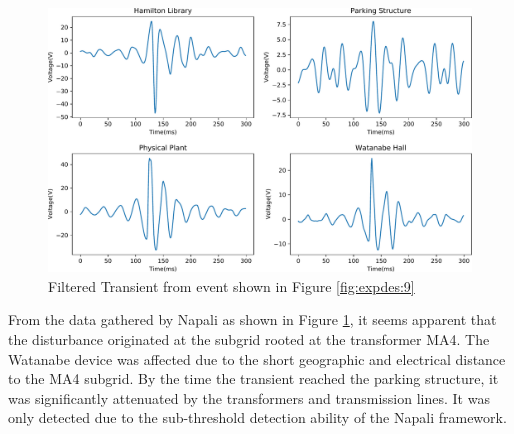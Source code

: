 \begin{figure}[ht!]
    \centering
    \includegraphics[width=1\linewidth]{img/deployment/gridwide_locality.pdf}
    \caption{Filtered Transient from event shown in Figure \ref{fig:expdes:9}}
    \label{expdes:fig:grid_wide_filtered}
\end{figure}

From the data gathered by Napali as shown in Figure \ref{expdes:fig:grid_wide_filtered}, it seems apparent that the disturbance originated at the subgrid rooted at the transformer MA4.
The Watanabe device was affected due to the short geographic and electrical distance to the MA4 subgrid.
By the time the transient reached the parking structure, it was significantly attenuated by the transformers and transmission lines.
It was only detected due to the sub-threshold detection ability of the Napali framework.

